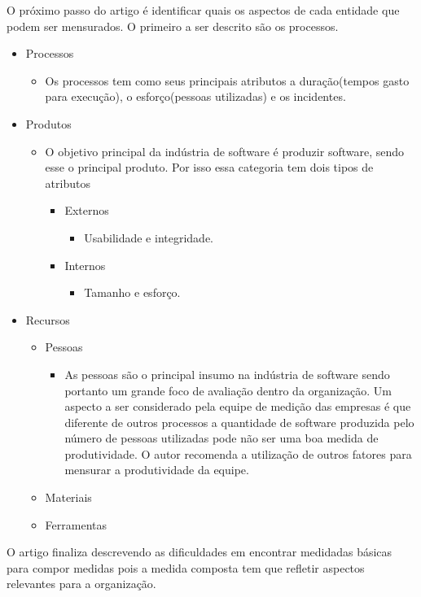 O próximo passo do artigo é identificar quais os aspectos de cada entidade que podem ser mensurados. O primeiro a ser descrito são os processos.

\begin{itemize}
\item Processos
    \begin{itemize}
        \item[] Os processos tem como seus principais atributos a duração(tempos gasto para execução), o esforço(pessoas utilizadas) e os incidentes.  
    \end{itemize}

\item Produtos
    \begin{itemize}
        \item[] O objetivo principal da indústria de software é produzir software, sendo esse o principal produto. Por isso essa categoria tem dois tipos de atributos
    \begin{itemize}
        \item Externos
            \begin{itemize}
            \item[] Usabilidade e integridade.
            \end{itemize}
        \item Internos
            \begin{itemize}
            \item[] Tamanho e esforço.
            \end{itemize}
    \end{itemize}
    \end{itemize}


\item Recursos
    \begin{itemize}
        \item[] Pessoas 
            \begin{itemize}
                \item[] As pessoas são o principal insumo na indústria de software sendo portanto um grande foco de avaliação dentro da organização. Um aspecto a ser considerado pela equipe de medição das empresas é que diferente de outros processos a quantidade de software produzida pelo número de pessoas utilizadas pode não ser uma boa medida de produtividade. O autor recomenda a utilização de outros fatores para mensurar a produtividade da equipe. 
            \end{itemize}
        \item[] Materiais
        \item[] Ferramentas
    \end{itemize}
\end{itemize} 

O artigo finaliza descrevendo as dificuldades em encontrar medidadas básicas para compor medidas pois a medida composta tem que refletir aspectos relevantes para a organização. 



